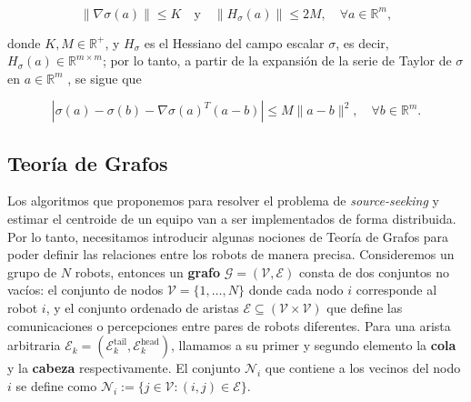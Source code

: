 \begin{equation} \label{eq_grad_hess_bound}
\|\nabla\sigma(a)\| \leq K \quad \text{y} \quad \|H_\sigma(a)\| \leq 2M, \quad \forall a\in\mathds{R}^m,
\end{equation}

donde $K, M\in\mathds{R}^+$, y $H_\sigma$ es el Hessiano del campo escalar $\sigma$, es decir, $H_\sigma(a)\in\mathds{R}^{m\times m}$; por lo tanto, a partir de la expansión de la serie de Taylor de $\sigma$ en $a\in\mathds{R}^m$ \cite[Teorema 5.15]{WalterRudin1976Principles}, se sigue que

\begin{equation} \label{eq: stay}
| \sigma(a) - \sigma(b) - \nabla\sigma(a)^T(a-b) | \leq M \|a -b\|^2, \quad \forall b\in\mathds{R}^m.
\end{equation}

\subsection{Teoría de Grafos}
Los algoritmos que proponemos para resolver el problema de \textit{source-seeking} y estimar el centroide de un equipo van a ser implementados de forma distribuida. Por lo tanto, necesitamos introducir algunas nociones de Teoría de Grafos \cite{bullo2020lectures} para poder definir las relaciones entre los robots de manera precisa. Consideremos un grupo de $N$ robots, entonces un \textbf{grafo} $\mathcal{G} = (\mathcal{V}, \mathcal{E})$ consta de dos conjuntos no vacíos: el conjunto de nodos $\mathcal{V} = \{1,\dots,N\}$ donde cada nodo $i$ corresponde al robot $i$, y el conjunto ordenado de aristas $\mathcal{E} \subseteq (\mathcal{V}\times\mathcal{V})$ que define las comunicaciones o percepciones entre pares de robots diferentes. Para una arista arbitraria $\mathcal{E}_k = (\mathcal{E}_k^{\text{tail}},\mathcal{E}_k^{\text{head}})$, llamamos a su primer y segundo elemento la \textbf{cola} y la \textbf{cabeza} respectivamente. El conjunto $\mathcal{N}_i$ que contiene a los vecinos del nodo $i$ se define como $\mathcal{N}_i:=\{j\in\mathcal{V}:(i,j)\in\mathcal{E}\}$.


